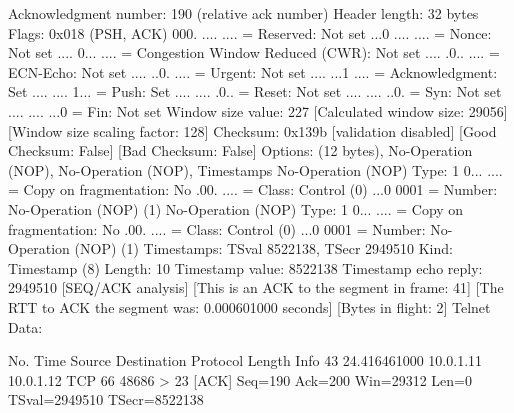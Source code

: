     Acknowledgment number: 190    (relative ack number)
    Header length: 32 bytes
    Flags: 0x018 (PSH, ACK)
        000. .... .... = Reserved: Not set
        ...0 .... .... = Nonce: Not set
        .... 0... .... = Congestion Window Reduced (CWR): Not set
        .... .0.. .... = ECN-Echo: Not set
        .... ..0. .... = Urgent: Not set
        .... ...1 .... = Acknowledgment: Set
        .... .... 1... = Push: Set
        .... .... .0.. = Reset: Not set
        .... .... ..0. = Syn: Not set
        .... .... ...0 = Fin: Not set
    Window size value: 227
    [Calculated window size: 29056]
    [Window size scaling factor: 128]
    Checksum: 0x139b [validation disabled]
        [Good Checksum: False]
        [Bad Checksum: False]
    Options: (12 bytes), No-Operation (NOP), No-Operation (NOP), Timestamps
        No-Operation (NOP)
            Type: 1
                0... .... = Copy on fragmentation: No
                .00. .... = Class: Control (0)
                ...0 0001 = Number: No-Operation (NOP) (1)
        No-Operation (NOP)
            Type: 1
                0... .... = Copy on fragmentation: No
                .00. .... = Class: Control (0)
                ...0 0001 = Number: No-Operation (NOP) (1)
        Timestamps: TSval 8522138, TSecr 2949510
            Kind: Timestamp (8)
            Length: 10
            Timestamp value: 8522138
            Timestamp echo reply: 2949510
    [SEQ/ACK analysis]
        [This is an ACK to the segment in frame: 41]
        [The RTT to ACK the segment was: 0.000601000 seconds]
        [Bytes in flight: 2]
Telnet
    Data: 

No.     Time           Source                Destination           Protocol Length Info
     43 24.416461000   10.0.1.11             10.0.1.12             TCP      66     48686 > 23 [ACK] Seq=190 Ack=200 Win=29312 Len=0 TSval=2949510 TSecr=8522138

